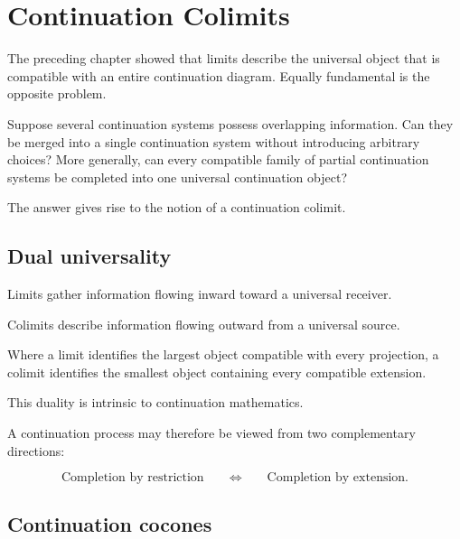 \documentclass[13pt,openany]{book}
\theoremstyle{plain}
\theoremstyle{definition}
\begin{document}
\chapter{Continuation Colimits}

The preceding chapter showed that limits describe the universal object that is
compatible with an entire continuation diagram. Equally fundamental is the
opposite problem.

Suppose several continuation systems possess overlapping information. Can they
be merged into a single continuation system without introducing arbitrary
choices? More generally, can every compatible family of partial continuation
systems be completed into one universal continuation object?

The answer gives rise to the notion of a continuation colimit.

\section{Dual universality}

Limits gather information flowing inward toward a universal receiver.

Colimits describe information flowing outward from a universal source.

Where a limit identifies the largest object compatible with every projection,
a colimit identifies the smallest object containing every compatible extension.

This duality is intrinsic to continuation mathematics.

A continuation process may therefore be viewed from two complementary
directions:

\[
\text{Completion by restriction}
\qquad\Longleftrightarrow\qquad
\text{Completion by extension.}
\]

\section{Continuation cocones}
\end{document}
